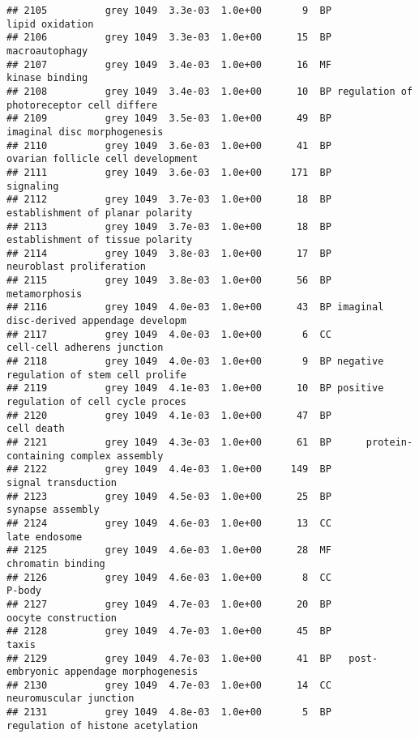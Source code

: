 \documentclass[]{article}
\begin{document}
\begin{verbatim}
## 2105          grey 1049  3.3e-03  1.0e+00       9  BP                          lipid oxidation
## 2106          grey 1049  3.3e-03  1.0e+00      15  BP                           macroautophagy
## 2107          grey 1049  3.4e-03  1.0e+00      16  MF                           kinase binding
## 2108          grey 1049  3.4e-03  1.0e+00      10  BP regulation of photoreceptor cell differe
## 2109          grey 1049  3.5e-03  1.0e+00      49  BP              imaginal disc morphogenesis
## 2110          grey 1049  3.6e-03  1.0e+00      41  BP        ovarian follicle cell development
## 2111          grey 1049  3.6e-03  1.0e+00     171  BP                                signaling
## 2112          grey 1049  3.7e-03  1.0e+00      18  BP         establishment of planar polarity
## 2113          grey 1049  3.7e-03  1.0e+00      18  BP         establishment of tissue polarity
## 2114          grey 1049  3.8e-03  1.0e+00      17  BP                 neuroblast proliferation
## 2115          grey 1049  3.8e-03  1.0e+00      56  BP                            metamorphosis
## 2116          grey 1049  4.0e-03  1.0e+00      43  BP imaginal disc-derived appendage developm
## 2117          grey 1049  4.0e-03  1.0e+00       6  CC              cell-cell adherens junction
## 2118          grey 1049  4.0e-03  1.0e+00       9  BP negative regulation of stem cell prolife
## 2119          grey 1049  4.1e-03  1.0e+00      10  BP positive regulation of cell cycle proces
## 2120          grey 1049  4.1e-03  1.0e+00      47  BP                               cell death
## 2121          grey 1049  4.3e-03  1.0e+00      61  BP      protein-containing complex assembly
## 2122          grey 1049  4.4e-03  1.0e+00     149  BP                      signal transduction
## 2123          grey 1049  4.5e-03  1.0e+00      25  BP                         synapse assembly
## 2124          grey 1049  4.6e-03  1.0e+00      13  CC                            late endosome
## 2125          grey 1049  4.6e-03  1.0e+00      28  MF                        chromatin binding
## 2126          grey 1049  4.6e-03  1.0e+00       8  CC                                   P-body
## 2127          grey 1049  4.7e-03  1.0e+00      20  BP                      oocyte construction
## 2128          grey 1049  4.7e-03  1.0e+00      45  BP                                    taxis
## 2129          grey 1049  4.7e-03  1.0e+00      41  BP   post-embryonic appendage morphogenesis
## 2130          grey 1049  4.7e-03  1.0e+00      14  CC                   neuromuscular junction
## 2131          grey 1049  4.8e-03  1.0e+00       5  BP        regulation of histone acetylation

\end{verbatim}
\end{document}
